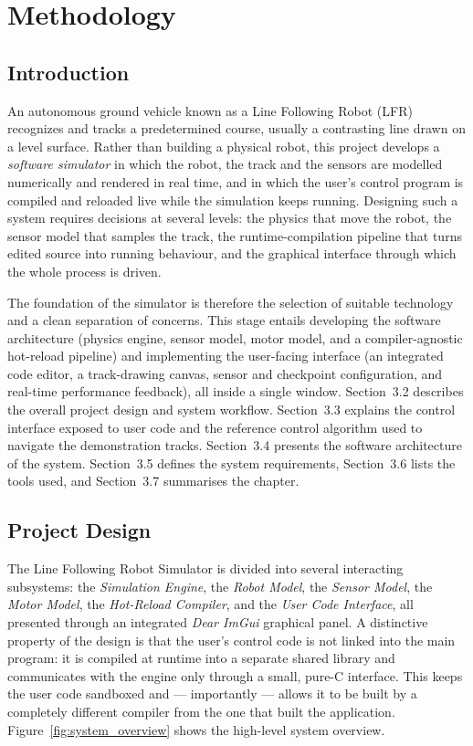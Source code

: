 \setlength{\parskip}{1.5em}
\chapter{Methodology}
\vspace{-5cm}

\section{Introduction}

An autonomous ground vehicle known as a Line Following Robot (LFR) recognizes and tracks a predetermined course, usually a contrasting line drawn on a level surface. Rather than building a physical robot, this project develops a \textit{software simulator} in which the robot, the track and the sensors are modelled numerically and rendered in real time, and in which the user's control program is compiled and reloaded live while the simulation keeps running. Designing such a system requires decisions at several levels: the physics that move the robot, the sensor model that samples the track, the runtime-compilation pipeline that turns edited source into running behaviour, and the graphical interface through which the whole process is driven.

The foundation of the simulator is therefore the selection of suitable technology and a clean separation of concerns. This stage entails developing the software architecture (physics engine, sensor model, motor model, and a compiler-agnostic hot-reload pipeline) and implementing the user-facing interface (an integrated code editor, a track-drawing canvas, sensor and checkpoint configuration, and real-time performance feedback), all inside a single window. Section~3.2 describes the overall project design and system workflow. Section~3.3 explains the control interface exposed to user code and the reference control algorithm used to navigate the demonstration tracks. Section~3.4 presents the software architecture of the system. Section~3.5 defines the system requirements, Section~3.6 lists the tools used, and Section~3.7 summarises the chapter.

\section{Project Design}
The Line Following Robot Simulator is divided into several interacting subsystems: the \textit{Simulation Engine}, the \textit{Robot Model}, the \textit{Sensor Model}, the \textit{Motor Model}, the \textit{Hot-Reload Compiler}, and the \textit{User Code Interface}, all presented through an integrated \textit{Dear ImGui} graphical panel. A distinctive property of the design is that the user's control code is not linked into the main program: it is compiled at runtime into a separate shared library and communicates with the engine only through a small, pure-C interface. This keeps the user code sandboxed and — importantly — allows it to be built by a completely different compiler from the one that built the application. Figure~\ref{fig:system_overview} shows the high-level system overview.

